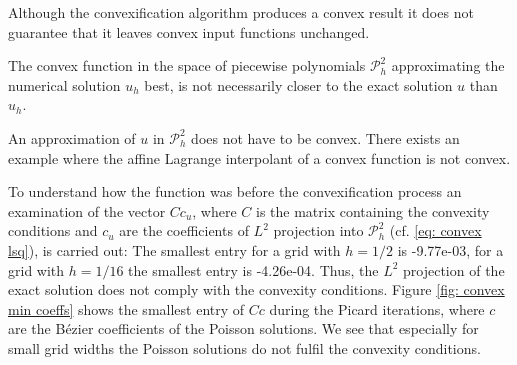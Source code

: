 Although the convexification algorithm produces a convex result it does not guarantee that it leaves convex input functions unchanged.

The convex function in the space of piecewise polynomials $\mathcal P^2_h$ approximating the numerical solution $u_h$ best, is not necessarily closer to the exact solution $u$ than $u_h$. %

An approximation of $u$ in $\mathcal P^2_h$ does not have to be convex. There exists an example where the affine Lagrange interpolant of a convex function is not convex\cite[p. 3142]{AM2009}. 

To understand how  the function was before the convexification process an examination of the vector $Cc_u$, where $C$ is the matrix containing the convexity conditions and $c_u$ are the coefficients of $L^2$ projection into $\mathcal P^2_h$ (cf. \eqref{eq: convex lsq}), is carried out: The smallest entry for a grid with $h=1/2$ is -9.77e-03, for a grid with $h=1/16$ the smallest entry is -4.26e-04. Thus, the $L^2$ projection of the exact solution does not comply with the convexity conditions.
Figure \ref{fig: convex min coeffs} shows the smallest entry of $Cc$ during the Picard iterations, where $c$ are the B\'ezier coefficients of the Poisson solutions. We see that especially for small grid widths the Poisson solutions do not fulfil the convexity conditions. 

